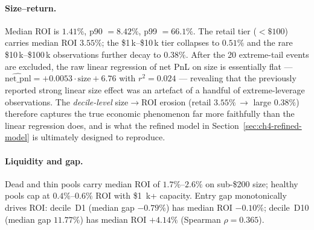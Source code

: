 \documentclass[sigconf,nonacm,10pt]{acmart}
\begin{document}
\paragraph{Size--return.} Median ROI is $1.41\%$, p90 $=8.42\%$, p99
$=66.1\%$. The retail tier ($<\$100$) carries median ROI $3.55\%$; the
\$1\,k--\$10\,k tier collapses to $0.51\%$ and the rare
\$10\,k--\$100\,k observations further decay to $0.38\%$. After
the 20 extreme-tail events are excluded, the raw linear regression
of net PnL on size is essentially flat --- $\widehat{\text{net\_pnl}} =
+0.0053\cdot\text{size} + 6.76$ with $r^{2}\!=\!0.024$ ---
revealing that the previously reported strong linear size effect
was an artefact of a handful of extreme-leverage observations.
The \emph{decile-level} size$\to$ROI erosion (retail
$3.55\%\,\to$ large $0.38\%$) therefore captures the true economic
phenomenon far more faithfully than the linear regression does,
and is what the refined model in Section~\ref{sec:ch4-refined-model}
is ultimately designed to reproduce.

\paragraph{Liquidity and gap.} Dead and thin pools carry median ROI of
$1.7\%$--$2.6\%$ on sub-\$200 size; healthy pools cap at $0.4\%$--$0.6\%$
ROI with \$1~k+ capacity. Entry gap monotonically drives ROI: decile~D1
(median gap $-0.79\%$) has median ROI $-0.10\%$; decile~D10 (median gap
$11.77\%$) has median ROI $+4.14\%$ (Spearman $\rho=0.365$).
\end{document}
